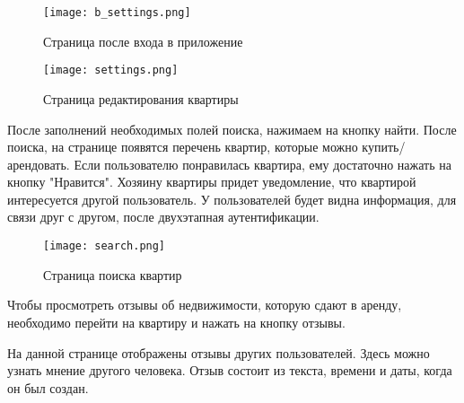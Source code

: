\begin{figure}[!htb]
	\centering
	\texttt{[image: b\_settings.png]}
	\caption{ Страница после входа в приложение}
	\label{fig:sec_usage::signIn}
\end{figure}

\begin{figure}[!htb]
	\centering
	\texttt{[image: settings.png]}
	\caption{ Страница редактирования квартиры}
	\label{fig:sec_usage::signIn}
\end{figure}

После заполнений необходимых полей поиска, нажимаем на кнопку найти. После поиска, на странице появятся перечень квартир, которые можно купить/арендовать. Если пользователю понравилась квартира, ему достаточно нажать на кнопку "Нравится". Хозяину квартиры придет уведомление, что квартирой интересуется другой пользователь. У пользователей будет видна информация, для связи друг с другом, после двухэтапная аутентификации. 

\begin{figure}[!htb]
	\centering
	\texttt{[image: search.png]}
	\caption{ Страница поиска квартир}
	\label{fig:sec_usage::signIn}
\end{figure}

Чтобы просмотреть отзывы об недвижимости, которую сдают в аренду, необходимо перейти на квартиру и нажать на кнопку отзывы.

На данной странице отображены отзывы других пользователей. Здесь можно узнать мнение другого человека. Отзыв состоит из текста, времени и даты, когда он был создан.

\clearpage


